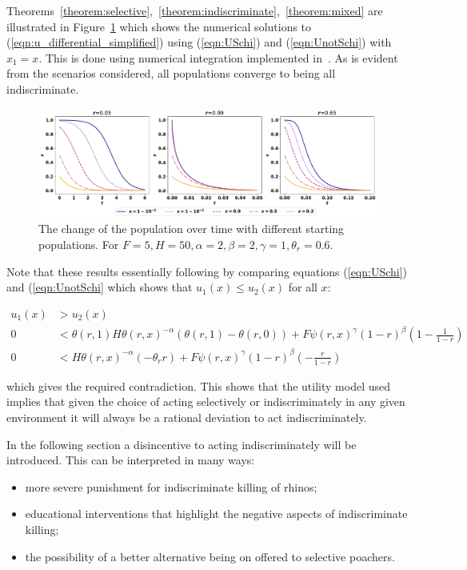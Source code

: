 \documentclass[10pt]{article}
\begin{document}
Theorems~\ref{theorem:selective},~\ref{theorem:indiscriminate},~\ref{theorem:mixed}
are illustrated in Figure~\ref{fig:indiscriminate_ess}
which shows the numerical solutions to (\ref{eqn:u_differential_simplified})
using (\ref{eqn:USchi}) and  (\ref{eqn:UnotSchi}) with \(x_1=x\).
This is done using numerical integration implemented  in~\cite{scipy}.
As is evident from the scenarios considered, all populations converge 
to being all indiscriminate.

\begin{figure}[!htbp]
    \includegraphics[width=\textwidth]{images/IndiscriminateESS.pdf}
    \caption{\label{fig:indiscriminate_ess} The change of the population over 
    time with different starting populations. For \(F=5, H=50,  
    \alpha=2, \beta=2, \gamma=1, \theta_r=0.6\).}
\end{figure}

Note that these results essentially following by comparing equations (\ref{eqn:USchi})
and (\ref{eqn:UnotSchi} which shows that \(u_1(x) \leq u_2(x)\) for all \(x\):

\begin{align}
    u_1(x) & > u_2(x)\\
    0 & < \theta(r, 1) H \theta(r, x) ^ {-\alpha} \left(\theta(r, 1) - \theta(r, 0)\right) 
    + F\psi(r, x) ^ {\gamma} (1 - r) ^ {\beta} \left(1 - \frac{1}{1 -
    r}\right) \\
    0 & < H \theta(r, x) ^ {-\alpha} \left(-\theta_r r\right)
    + F\psi(r, x) ^ {\gamma} (1 - r) ^ {\beta} \left( - \frac{r}{1 -
    r}\right) 
\end{align}

which gives the required contradiction. This shows that the utility model used
implies that given the choice of acting selectively or indiscriminately in any
given environment it will always be a rational deviation to act
indiscriminately.

In the following section a disincentive to acting indiscriminately will be
introduced. This can be interpreted in many ways:

\begin{itemize}
    \item more severe punishment for indiscriminate killing of rhinos;
    \item educational interventions that highlight the negative aspects of
        indiscriminate killing;
    \item the possibility of a better alternative being on offered to selective
        poachers.
\end{itemize}
\end{document}
